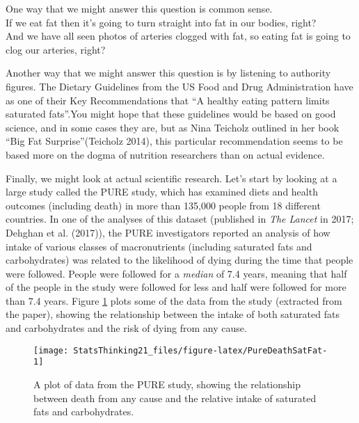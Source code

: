 \documentclass[]{book}
\theoremstyle{definition}
\theoremstyle{definition}
\theoremstyle{definition}
\theoremstyle{remark}
\begin{document}
One way that we might answer this question is common sense.\\
If we eat fat then it's going to turn straight into fat in our bodies,
right?\\
And we have all seen photos of arteries clogged with fat, so eating fat
is going to clog our arteries, right?

Another way that we might answer this question is by listening to
authority figures. The Dietary Guidelines from the US Food and Drug
Administration have as one of their Key Recommendations that ``A healthy
eating pattern limits saturated fats''.You might hope that these
guidelines would be based on good science, and in some cases they are,
but as Nina Teicholz outlined in her book ``Big Fat Surprise''(Teicholz
2014), this particular recommendation seems to be based more on the
dogma of nutrition researchers than on actual evidence.

Finally, we might look at actual scientific research. Let's start by
looking at a large study called the PURE study, which has examined diets
and health outcomes (including death) in more than 135,000 people from
18 different countries. In one of the analyses of this dataset
(published in \emph{The Lancet} in 2017; Dehghan et al. (2017)), the
PURE investigators reported an analysis of how intake of various classes
of macronutrients (including saturated fats and carbohydrates) was
related to the likelihood of dying during the time that people were
followed. People were followed for a \emph{median} of 7.4 years, meaning
that half of the people in the study were followed for less and half
were followed for more than 7.4 years. Figure \ref{fig:PureDeathSatFat}
plots some of the data from the study (extracted from the paper),
showing the relationship between the intake of both saturated fats and
carbohydrates and the risk of dying from any cause.

\begin{figure}
\texttt{[image: StatsThinking21\_files/figure-latex/PureDeathSatFat-1]} \caption{A plot of data from the PURE study, showing the relationship between death from any cause and the relative intake of saturated fats and carbohydrates.}\label{fig:PureDeathSatFat}
\end{figure}
\end{document}
